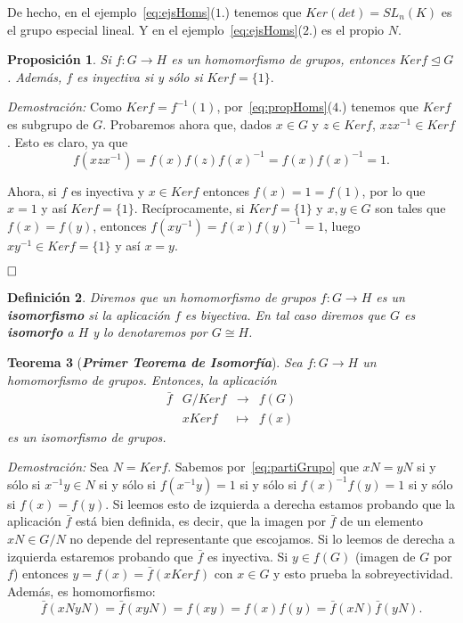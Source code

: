 \documentclass[12pt]{article}
\newtheorem{theorem}{Teorema}[section]
\newtheorem{proposition}[theorem]{Proposición}
\newtheorem{definition}[theorem]{Definición}
\begin{document}
De hecho, en el ejemplo~\ref{eq:ejsHoms}($1.$) tenemos que $Ker(det) = SL_n(K)$ es el grupo especial lineal. Y en el ejemplo~\ref{eq:ejsHoms}($2.$) es el propio $N$.

\begin{proposition}Si $f \colon G \longrightarrow H$ es un homomorfismo de grupos, entonces $Ker f \unlhd G$. Además, $f$ es inyectiva si y sólo si $Ker f= \lbrace 1 \rbrace.$
\end{proposition}
\emph{Demostración: }Como $Ker f=f^{-1} (1)$, por~\ref{eq:propHoms}($4.$) tenemos que $Ker f$ es subgrupo de $G$. Probaremos ahora que, dados $x \in G$ y $z \in Ker f$, $xzx^{-1} \in Ker f$. Esto es claro, ya que $$f(xzx^{-1})=f(x)f(z)f(x)^{-1} = f(x)f(x)^{-1} = 1.$$

Ahora, si $f$ es inyectiva y $x \in Ker f$ entonces $f(x) = 1 = f(1)$, por lo que $x = 1$ y así $Ker f = \lbrace 1 \rbrace$. Recíprocamente, si $Ker f = \lbrace 1 \rbrace$ y $x,y \in G$ son tales que $f(x) = f(y)$, entonces $f(xy^{-1}) = f(x)f(y)^{-1} = 1$, luego $xy^{-1} \in Ker f = \lbrace 1 \rbrace$ y así $x=y$.

$\hfill \square$

\begin{definition}Diremos que un homomorfismo de grupos $f \colon G \longrightarrow H$ es un \textbf{isomorfismo} si la aplicación $f$ es biyectiva. En tal caso diremos que $G$ es \textbf{isomorfo} a $H$ y lo denotaremos por $G \cong H$.
\end{definition}

\begin{theorem}[\textbf{\textit{Primer Teorema de Isomorfía}}]
Sea $f \colon G \longrightarrow H$ un homomorfismo de grupos. Entonces, la aplicación $$\begin{array}{rccl}
\bar{f} &G/Ker f&\longrightarrow &f(G) \\
&xKer f& \longmapsto &f(x)
\end{array}
$$
es un isomorfismo de grupos.
\end{theorem}
\emph{Demostración: }Sea $N = Ker f$. Sabemos por~\ref{eq:partiGrupo} que $xN = yN$ si y sólo si $x^{-1}y \in N$ si y sólo si $f(x^{-1}y)=1$ si y sólo si $f(x)^{-1}f(y) = 1$ si y sólo si $f(x)=f(y)$. Si leemos esto de izquierda a derecha estamos probando que la aplicación $\bar{f}$ está bien definida, es decir, que la imagen por $\bar{f}$ de un elemento $xN \in G/N$ no depende del representante que escojamos. Si lo leemos de derecha a izquierda estaremos probando que $\bar{f}$ es inyectiva. Si $y \in f(G)$ (imagen de $G$ por $f$) entonces $y=f(x)=\bar{f}(xKer f)$ con $x\in G$ y esto prueba la sobreyectividad. Además, es homomorfismo: $$\bar{f}(xNyN)= \bar{f}(xyN)=f(xy)=f(x)f(y) =\bar{f}(xN) \bar{f}(yN).$$ 
\end{document}
